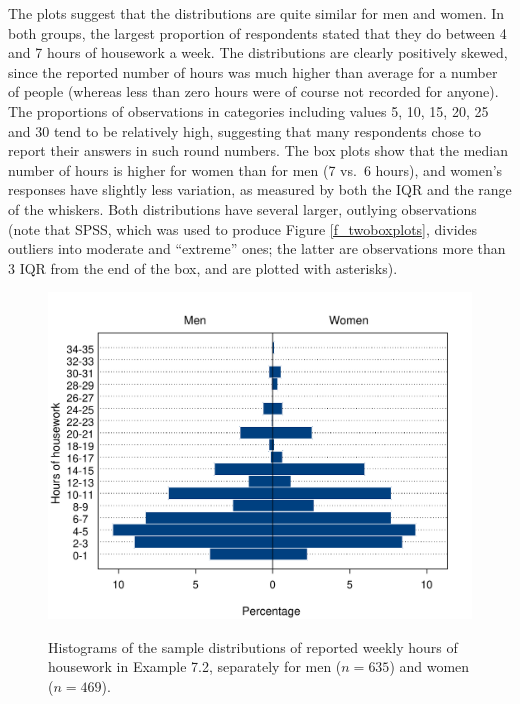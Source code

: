 The plots suggest that the distributions are quite similar for men and
women. In both groups, the largest proportion of respondents stated that
they do between 4 and 7 hours of housework a week. The distributions are
clearly positively skewed, since the reported number of hours was much
higher than average for a number of people (whereas less than zero hours
were of course not recorded for anyone). The proportions of observations
in categories including values 5, 10, 15, 20, 25 and 30 tend to be
relatively high, suggesting that many respondents chose to report
their answers in such round numbers. The box plots show that the median
number of hours is higher for women than for men (7 vs.\ 6 hours), and
women's responses have slightly less variation, as measured by both the
IQR and the range of the whiskers. Both distributions have several larger, outlying
observations (note that SPSS, which was used to produce Figure \ref{f_twoboxplots}, divides
outliers into moderate and ``extreme'' ones; the latter are
observations more than 3 IQR from the end of the box, and are plotted
with asterisks).

\begin{figure}
\caption{Histograms of
the sample distributions of reported
weekly hours of housework in Example 7.2, separately for men ($n=635$)
and women ($n=469$).
}
\label{f_hworkpyramid}

\begin{center}
\includegraphics[width=130mm]{hworkpyramid}\\
\end{center}

\end{figure}

